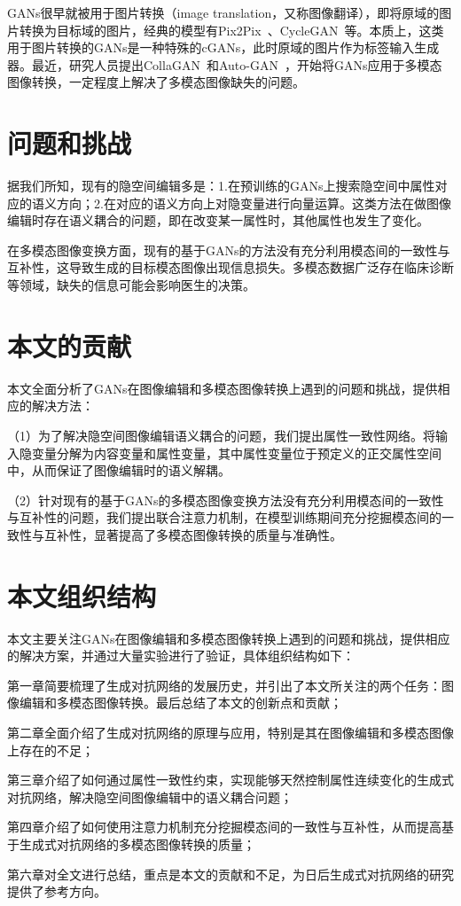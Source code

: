 GANs很早就被用于图片转换（image translation，又称图像翻译），即将原域的图片转换为目标域的图片，经典的模型有Pix2Pix~\cite{pix2pix}、CycleGAN~\cite{cyclegan}等。本质上，这类用于图片转换的GANs是一种特殊的cGANs，此时原域的图片作为标签输入生成器。最近，研究人员提出CollaGAN~\cite{collagan}和Auto-GAN~\cite{AutoGAN}，开始将GANs应用于多模态图像转换，一定程度上解决了多模态图像缺失的问题。


\section{问题和挑战}

据我们所知，现有的隐空间编辑多是：1.在预训练的GANs上搜索隐空间中属性对应的语义方向；2.在对应的语义方向上对隐变量进行向量运算。这类方法在做图像编辑时存在语义耦合的问题，即在改变某一属性时，其他属性也发生了变化。

在多模态图像变换方面，现有的基于GANs的方法没有充分利用模态间的一致性与互补性，这导致生成的目标模态图像出现信息损失。多模态数据广泛存在临床诊断等领域，缺失的信息可能会影响医生的决策。

\section{本文的贡献}

本文全面分析了GANs在图像编辑和多模态图像转换上遇到的问题和挑战，提供相应的解决方法：

（1）为了解决隐空间图像编辑语义耦合的问题，我们提出属性一致性网络。将输入隐变量分解为内容变量和属性变量，其中属性变量位于预定义的正交属性空间中，从而保证了图像编辑时的语义解耦。

（2）针对现有的基于GANs的多模态图像变换方法没有充分利用模态间的一致性与互补性的问题，我们提出联合注意力机制，在模型训练期间充分挖掘模态间的一致性与互补性，显著提高了多模态图像转换的质量与准确性。

\section{本文组织结构}

本文主要关注GANs在图像编辑和多模态图像转换上遇到的问题和挑战，提供相应的解决方案，并通过大量实验进行了验证，具体组织结构如下：

第一章简要梳理了生成对抗网络的发展历史，并引出了本文所关注的两个任务：图像编辑和多模态图像转换。最后总结了本文的创新点和贡献；

第二章全面介绍了生成对抗网络的原理与应用，特别是其在图像编辑和多模态图像上存在的不足；

第三章介绍了如何通过属性一致性约束，实现能够天然控制属性连续变化的生成式对抗网络，解决隐空间图像编辑中的语义耦合问题；

第四章介绍了如何使用注意力机制充分挖掘模态间的一致性与互补性，从而提高基于生成式对抗网络的多模态图像转换的质量；

第六章对全文进行总结，重点是本文的贡献和不足，为日后生成式对抗网络的研究提供了参考方向。